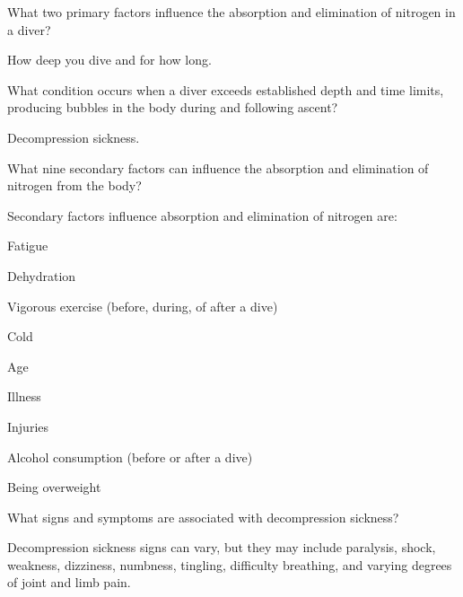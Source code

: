 	\begin{qanda}
		\begin{question}
What two primary factors influence the absorption and elimination of nitrogen in a diver?
		\end{question}

		\begin{answer}
How deep you dive and for how long.
		\end{answer}
	\end{qanda}

	\begin{qanda}
		\begin{question}
What condition occurs when a diver exceeds established depth and time limits, producing bubbles in the body during and following ascent?
		\end{question}

		\begin{answer}
Decompression sickness.
		\end{answer}
	\end{qanda}

	\begin{qanda}
		\begin{question}
What nine secondary factors can influence the absorption and elimination of nitrogen from the body?
		\end{question}

		\begin{answer}
Secondary factors influence absorption and elimination of nitrogen are:
			\begin{nospacenumberedlist}
				\item Fatigue
				\item Dehydration
				\item Vigorous exercise (before, during, of after a dive)
				\item Cold
				\item Age
				\item Illness
				\item Injuries
				\item Alcohol consumption (before or after a dive)
				\item Being overweight
			\end{nospacenumberedlist}
		\end{answer}
	\end{qanda}

	\begin{qanda}
		\begin{question}
What signs and symptoms are associated with decompression sickness?
		\end{question}

		\begin{answer}
Decompression sickness signs can vary, but they may include paralysis, shock, weakness, dizziness, numbness, tingling, difficulty breathing, and varying degrees of joint and limb pain.
		\end{answer}
	\end{qanda}

